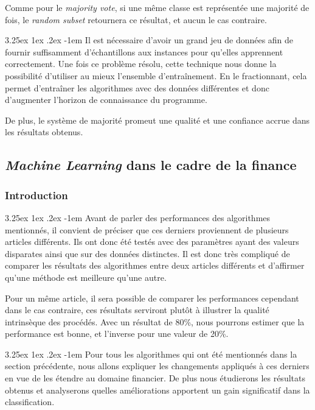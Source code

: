 \documentclass[a4paper, 11pt]{article}
\makeatletter
\renewcommand\paragraph{\@startsection{paragraph}{5}{\z@}%
  {3.25ex \@plus1ex \@minus.2ex}%
  {-1em}%
  {\normalfont\normalsize\bfseries}}
\makeatother
\begin{document}
Comme pour le \textit{majority vote}, si une même classe est représentée une majorité de fois, le \textit{random subset} retournera ce résultat, et aucun le cas contraire.

\paragraph{}
Il est nécessaire d'avoir un grand jeu de données afin de fournir suffisamment d'échantillons aux instances pour qu'elles
apprennent correctement.
Une fois ce problème résolu, cette technique nous donne la possibilité d'utiliser au mieux l'ensemble d'entraînement.
En le fractionnant, cela permet d'entraîner les algorithmes avec des données différentes et donc d'augmenter
l'horizon de connaissance du programme.

De plus, le système de majorité promeut une qualité et une confiance accrue dans les résultats obtenus.


\subsection{\textit{Machine Learning} dans le cadre de la finance}\label{section machine learning finance}
\subsubsection{Introduction}
\paragraph{}
Avant de parler des performances des algorithmes mentionnés, il convient de préciser que ces derniers proviennent
de plusieurs articles différents. Ils ont donc été testés avec des paramètres ayant des valeurs disparates ainsi
que sur des données distinctes.
Il est donc très compliqué de comparer les résultats des algorithmes entre deux articles différents et
d'affirmer qu'une méthode est meilleure qu'une autre. 

Pour un même article, il sera possible de comparer les performances  cependant dans le cas contraire, ces
résultats serviront plutôt à illustrer la qualité intrinsèque des procédés. Avec un résultat de 80\%,
nous pourrons estimer que la performance est bonne, et l'inverse pour une valeur de 20\%.

\paragraph{}
Pour tous les algorithmes qui ont été mentionnés dans la section précédente, nous allons expliquer les changements
appliqués à ces derniers en vue de les étendre au domaine financier. De plus nous étudierons les résultats obtenus
et analyserons quelles améliorations apportent un gain significatif dans la classification.
\end{document}
